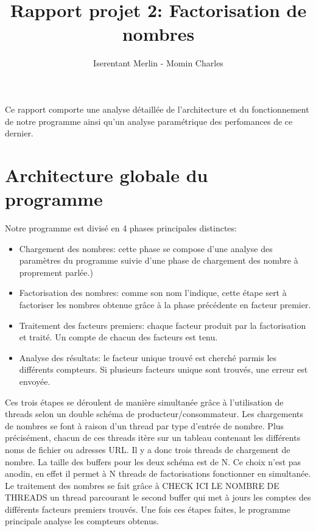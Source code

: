 \documentclass[11pt,a4paper]{article}
\begin{document}
\author{Iserentant Merlin - Momin Charles}
\title{Rapport projet 2: Factorisation de nombres}
\maketitle

Ce rapport comporte une analyse détaillée de l'architecture et du fonctionnement de notre programme ainsi qu'un analyse paramétrique des perfomances de ce dernier. 

\section*{Architecture globale du programme}
Notre programme est divisé en 4 phases principales distinctes:

\begin{itemize}
\item{Chargement des nombres: cette phase se compose d'une analyse des paramètres du programme suivie d'une phase de chargement des nombre à proprement parlée.)}
\item{Factorisation des nombres: comme son nom l'indique, cette étape sert à factoriser les nombres obtenue grâce à la phase précédente en facteur premier.}
\item{Traitement des facteurs premiers: chaque facteur produit par la factorisation et traité. Un compte de chacun des facteurs est tenu.}
\item{Analyse des résultats: le facteur unique trouvé est cherché parmis les différents compteurs. Si plusieurs facteurs unique sont trouvés, une erreur est envoyée.}
\end{itemize}

Ces trois étapes se déroulent de manière simultanée grâce à l'utilisation de threads selon un double schéma de producteur/consommateur. Les chargements de nombres se font à raison d'un thread par type d'entrée de nombre. Plus précisément, chacun de ces threads itère sur un tableau contenant les différents noms de fichier ou adresses URL. Il y a donc trois threads de chargement de nombre.  La taille des buffers pour les deux schéma est de N. Ce choix n'est pas anodin, en effet il permet à N threads de factorisations fonctionner en simultanée. Le traitement des nombres se fait grâce à CHECK ICI LE NOMBRE DE THREADS un thread parcourant le second buffer qui met à jours les comptes des différents facteurs premiers trouvés.
Une fois ces étapes faites, le programme principale analyse les compteurs obtenus.
\end{document}
